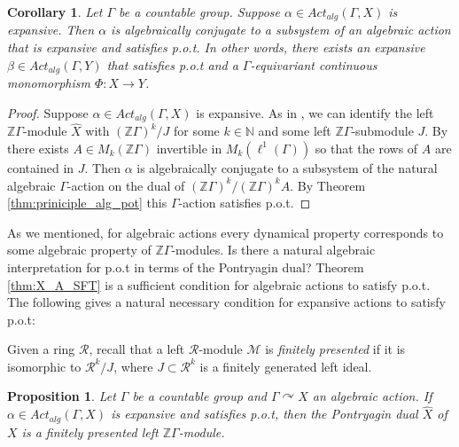 \documentclass[oneside,english]{amsart}
\newtheorem{prop}[thm]{Proposition}
\newtheorem{cor}[thm]{Corollary}
\theoremstyle{definition}
\newcommand{\ZZ}{\mathbb{Z}}
\newcommand{\act}[2]{{#1} \curvearrowright {#2}}
\newcommand{\Alg}[2]{\mathit{Act}_{\mathit{alg}}({#1},{#2})}
\begin{document}
\begin{cor}
Let $\Gamma$ be a countable group.
Suppose $\alpha \in \Alg{\Gamma}{X}$ is expansive. Then
$\alpha$ is algebraically  conjugate to a subsystem  of an algebraic action that is expansive and  satisfies p.o.t.
In other words,
there exists an expansive $\beta \in \Alg{\Gamma}{Y}$ that satisfies p.o.t and a $\Gamma$-equivariant  continuous monomorphism $\Phi:X \to Y$.
\end{cor}
\begin{proof}
Suppose $\alpha \in \Alg{\Gamma}{X}$ is expansive. As in \cite{MR3314515}, we can identify the left $\mathbb{Z}\Gamma$-module $\widehat{X}$ with $(\mathbb{Z}\Gamma)^k/J$ for some $k \in \mathbb{N}$ and some left  $\mathbb{Z}\Gamma$-submodule $J$.
By \cite[Theorem $3.1$]{MR3314515} there exists $A \in M_k(\mathbb{Z}\Gamma)$ invertible in $M_k(\ell^1(\Gamma))$ so that the rows of $A$ are contained in $J$.
Then $\alpha$ is algebraically  conjugate to a subsystem  of the natural algebraic $\Gamma$-action on the dual of  $(\mathbb{Z}\Gamma)^k/(\mathbb{Z}\Gamma)^kA$.
By Theorem \ref{thm:priniciple_alg_pot}  this $\Gamma$-action satisfies p.o.t.
\end{proof}

As we mentioned, for algebraic actions every dynamical property corresponds to some algebraic property of $\mathbb{Z}\Gamma$-modules.
Is there a natural algebraic interpretation for p.o.t in terms of the  Pontryagin dual?
Theorem \ref{thm:X_A_SFT} is a sufficient condition for algebraic actions to satisfy p.o.t. The following gives a natural necessary condition for expansive actions to satisfy p.o.t:


Given a ring $\mathcal{R}$, recall that a left $\mathcal{R}$-module $\mathcal{M}$ is \emph{finitely presented} if it is isomorphic to $\mathcal{R}^k/J$, where $J \subset \mathcal{R}^k$ is a finitely generated left ideal.

\begin{prop}\label{thm:finitely_presented_finite_type}
Let $\Gamma$ be a countable group and $\act{\Gamma}{X}$ an algebraic action.
If $\alpha \in \Alg{\Gamma}{X}$  is expansive and satisfies p.o.t, then the Pontryagin dual $\widehat X$ of $X$ is a finitely presented left $\ZZ\Gamma$-module.

\end{prop}
\end{document}

